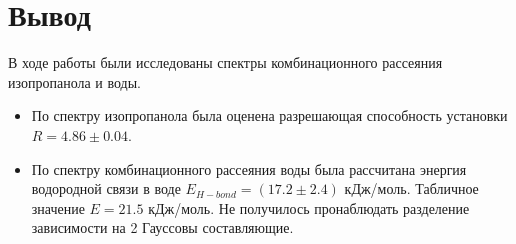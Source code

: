 \documentclass[a4paper,12pt]{article} %
\begin{document}
\section{Вывод}
 В ходе работы были исследованы спектры комбинационного рассеяния изопропанола и воды. 

\begin{itemize}
    \item По спектру изопропанола была оценена разрешающая способность установки $R = 4.86 \pm 0.04$. 


 \item По спектру комбинационного рассеяния воды была рассчитана энергия водородной связи в воде $E_{H-bond}=(17.2\pm2.4)$ кДж/моль. Табличное значение $E = 21.5$ кДж/моль. Не получилось пронаблюдать разделение зависимости на 2 Гауссовы составляющие.
 \end{itemize}

\newpage
\end{document}
